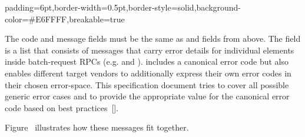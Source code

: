\documentclass[11pt]{article}
\begin{document}
{%
\begin{mdbmargintb}{6pt}{6pt}%
\begin{mdblock}{padding=6pt,border-width=0.5pt,border-style=solid,background-color=\#E6FFFF,breakable=true}%
\begin{mdpre}%
\end{mdpre}%
\end{mdblock}%
\end{mdbmargintb}%

\noindent{}The code and message fields must be the same as  and 
fields from  above. The  field is a list that consists of
 messages that carry error details for individual elements inside
batch-request RPCs (e.g.  and ).  includes a canonical
error code but also enables different target vendors to additionally express
their own error codes in their chosen error-space. This specification document
tries to cover all possible generic error cases and to provide the appropriate
value for the canonical error code based on best practices~[].%

Figure~ illustrates how these messages fit together.%

}
\end{document}
